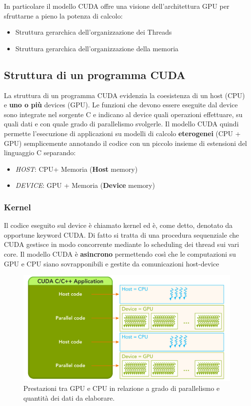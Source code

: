 In particolare il modello CUDA offre una visione dell’architettura GPU per sfruttarne a pieno la potenza di calcolo:
\begin{itemize}
\item Struttura gerarchica dell’organizzazione dei Threads
\item Struttura gerarchica dell’organizzazione della memoria
\end{itemize}

\subsection{Struttura di un programma CUDA}
La struttura di un programma CUDA evidenzia la coesistenza di un host (CPU) e \textbf{uno o più} devices (GPU). Le funzioni che devono essere eseguite dal device sono integrate nel sorgente C e indicano al device quali operazioni effettuare, su quali dati e con quale grado di parallelismo svolgerle. Il modello CUDA quindi permette l’esecuzione di applicazioni su modelli di calcolo \textbf{eterogenei} (CPU + GPU) semplicemente annotando il codice con un piccolo insieme di estensioni del linguaggio C separando:
\begin{itemize}
\item \textit{HOST}: CPU+ Memoria (\textbf{Host} memory)
\item \textit{DEVICE}: GPU + Memoria (\textbf{Device} memory)
\end{itemize}

\subsubsection{Kernel}
Il codice eseguito sul device è chiamato kernel ed è, come detto, denotato da opportune keyword CUDA. Di fatto si tratta di una procedura sequenziale che CUDA gestisce in modo concorrente mediante lo scheduling dei thread sui vari core. Il modello CUDA è \textbf{asincrono} permettendo così che le computazioni su GPU e CPU siano sovrapponibili e gestite da comunicazioni host-device

\begin{figure}[H]
\centering
\includegraphics[scale=0.6]{img/program.png}
\caption{Prestazioni tra GPU e CPU in relazione a grado di parallelismo e quantità dei dati da elaborare.}
\end{figure}

